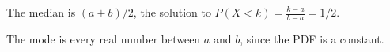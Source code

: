 
The median is \((a+b)/2\), the solution to \(P(X<k) = \frac{k-a}{b-a} = 1/2\). 

The mode is every real number between \(a\) and \(b\), since the PDF is a constant. 
